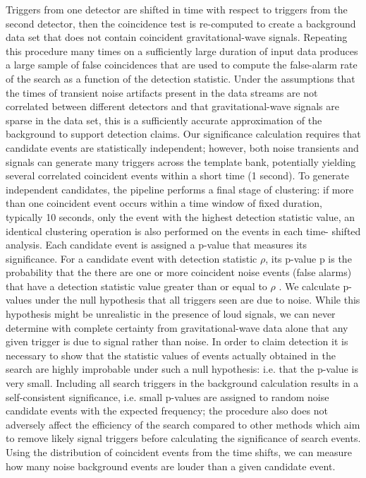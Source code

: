\documentclass[binding=0.6cm, LaM]{sapthesis}
\begin{document}
 
	Triggers from one detector are shifted in time
	 with respect to triggers from the second detector, 
	then the coincidence test is re-computed to create a background data set 
	that does not contain coincident gravitational-wave signals. 
	Repeating this procedure many times on a sufficiently large duration of input data 
	produces a large sample of false coincidences that are used to compute 
	the false-alarm rate of the search as a function of the detection statistic. 
	Under the assumptions that the times of transient noise artifacts 
	present in the data streams are not correlated between different detectors
	and that gravitational-wave signals are sparse in the data set, 
	this is a sufficiently accurate approximation of the background to support detection claims. 
	Our significance calculation requires that candidate events are statistically independent; 
	however, both noise transients and signals can generate many triggers across the template bank, 
	potentially yielding several correlated coincident events within a short time (1 second). 
	To generate independent candidates, the pipeline performs a final stage of clustering: 
	if more than one coincident event occurs within a time window of fixed duration,	
	typically 10 seconds, only the event with the highest detection statistic value,
	an identical clustering operation is also performed on the events in each time- shifted analysis. 
	Each candidate event is assigned a p-value that measures its significance. 
	For a candidate event with detection statistic $\rho$, its p-value p is the probability that the 
	there are one or more coincident noise events (false alarms) that have 
	a detection statistic value greater than or equal to $\rho$ . 
	We calculate p-values under the null hypothesis that all triggers seen are due to noise. 
	While this hypothesis might be unrealistic in the presence of loud signals, 
	we can never determine with complete certainty from gravitational-wave data alone 
	that any given trigger is due to signal rather than noise. 
	In order to claim detection it is necessary to show that the statistic values 	
	of events actually obtained in the search are highly improbable under such a null hypothesis: 
	i.e. that the p-value is very small. 
	Including all search triggers in the background calculation results in a self-consistent significance, 
	i.e. small p-values are assigned to random noise candidate events with the expected frequency; 
	the procedure also does not adversely affect the efficiency of the search 
	compared to other methods which aim to remove likely signal triggers before calculating the significance of search events. 
	Using the distribution of coincident events from the time shifts, we can measure 
	how many noise background events are louder than a given candidate event. 
\end{document}

